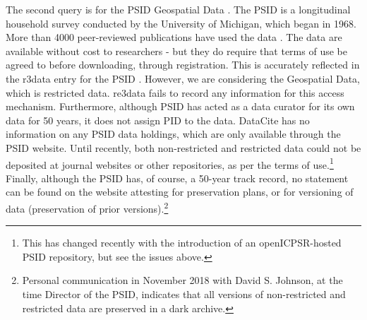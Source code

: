 The second query is for the \ac{PSID} Geospatial Data \parencite{psid-geodata}. The \ac{PSID} is a longitudinal household survey conducted by the University of Michigan, which began in 1968. More than 4000 peer-reviewed publications have used the data \parencite{psid-homepage}. The data are available without cost to researchers - but they do require that terms of use be agreed to before downloading, through registration. This is accurately reflected in the r3data entry for the \ac{PSID} \parencite{Re3data-psid}. However, we are considering the Geospatial Data, which is restricted data. re3data fails to record any information for this access mechanism. Furthermore, although \ac{PSID} has acted as a data curator for its own data for 50 years, it does not assign \ac{PID} to the data. DataCite has no information on any  \ac{PSID} data holdings, which are only available through the \ac{PSID} website. Until recently, both non-restricted and restricted data could not be deposited at journal websites or other repositories, as per the terms of use.\footnote{This has changed recently with the introduction of an openICPSR-hosted \ac{PSID} repository, but see the issues above.} Finally, although the \ac{PSID} has, of course, a 50-year track record, no statement can be found on the website attesting for preservation plans, or for versioning of data (preservation of prior versions).\footnote{Personal communication in November 2018 with David S. Johnson, at the time Director of the \ac{PSID}, indicates that all versions of non-restricted and restricted data are preserved in a dark archive.}

